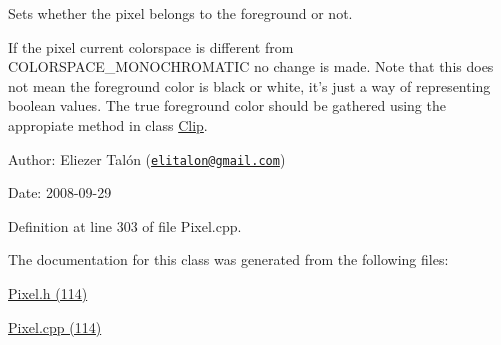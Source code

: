 Sets whether the pixel belongs to the foreground or not. 

If the pixel current colorspace is different from COLORSPACE\_\-MONOCHROMATIC no change is made. Note that this does not mean the foreground color is black or white, it's just a way of representing boolean values. The true foreground color should be gathered using the appropiate method in class \hyperlink{class_clip}{Clip}.

\begin{Desc}
\item[Author:]Eliezer Talón (\href{mailto:elitalon@gmail.com}{\tt elitalon@gmail.com}) \end{Desc}
\begin{Desc}
\item[Date:]2008-09-29 \end{Desc}


Definition at line 303 of file Pixel.cpp.

The documentation for this class was generated from the following files:\begin{CompactItemize}
\item 
\hyperlink{_pixel_8h}{Pixel.h (114)}\item 
\hyperlink{_pixel_8cpp}{Pixel.cpp (114)}\end{CompactItemize}
